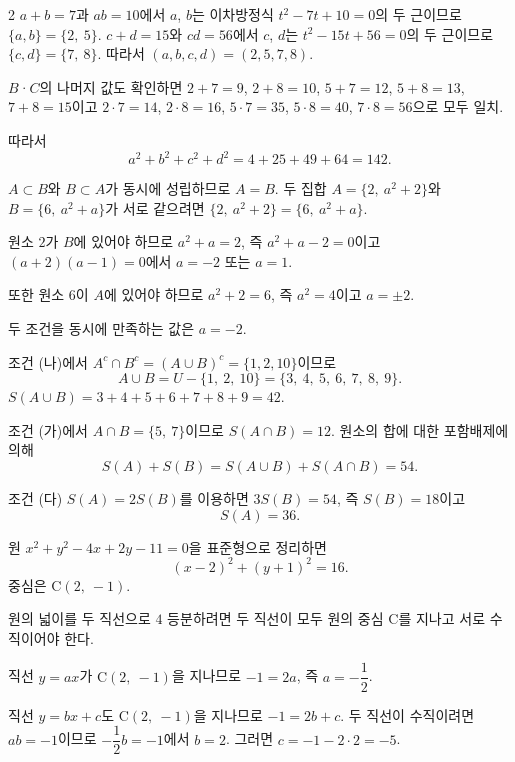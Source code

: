 \documentclass[10pt,fleqn]{article}
\begin{document}
\begin{multicols}{2}
$a + b = 7$과 $ab = 10$에서 $a$, $b$는 이차방정식 $t^{2} - 7t + 10 = 0$의 두 근이므로 $\{a, b\} = \{2,\ 5\}$. $c + d = 15$와 $cd = 56$에서 $c$, $d$는 $t^{2} - 15t + 56 = 0$의 두 근이므로 $\{c, d\} = \{7,\ 8\}$. 따라서 $(a, b, c, d) = (2, 5, 7, 8)$.

$B$·$C$의 나머지 값도 확인하면 $2 + 7 = 9$, $2 + 8 = 10$, $5 + 7 = 12$, $5 + 8 = 13$, $7 + 8 = 15$이고 $2 \cdot 7 = 14$, $2 \cdot 8 = 16$, $5 \cdot 7 = 35$, $5 \cdot 8 = 40$, $7 \cdot 8 = 56$으로 모두 일치.

따라서
\[ a^{2} + b^{2} + c^{2} + d^{2} = 4 + 25 + 49 + 64 = 142. \]


$A \subset B$와 $B \subset A$가 동시에 성립하므로 $A = B$. 두 집합 $A = \{2,\ a^{2} + 2\}$와 $B = \{6,\ a^{2} + a\}$가 서로 같으려면 $\{2,\ a^{2}+2\} = \{6,\ a^{2}+a\}$.

원소 $2$가 $B$에 있어야 하므로 $a^{2} + a = 2$, 즉 $a^{2} + a - 2 = 0$이고 $(a+2)(a-1) = 0$에서 $a = -2$ 또는 $a = 1$.

또한 원소 $6$이 $A$에 있어야 하므로 $a^{2} + 2 = 6$, 즉 $a^{2} = 4$이고 $a = \pm 2$.

두 조건을 동시에 만족하는 값은 $a = -2$.


조건 (나)에서 $A^{c} \cap B^{c} = (A \cup B)^{c} = \{1, 2, 10\}$이므로
\[ A \cup B = U - \{1,\ 2,\ 10\} = \{3,\ 4,\ 5,\ 6,\ 7,\ 8,\ 9\}. \]
$S(A \cup B) = 3 + 4 + 5 + 6 + 7 + 8 + 9 = 42$.

조건 (가)에서 $A \cap B = \{5,\ 7\}$이므로 $S(A \cap B) = 12$. 원소의 합에 대한 포함배제에 의해
\[ S(A) + S(B) = S(A \cup B) + S(A \cap B) = 54. \]

조건 (다) $S(A) = 2 S(B)$를 이용하면 $3 S(B) = 54$, 즉 $S(B) = 18$이고
\[ S(A) = 36. \]


원 $x^{2} + y^{2} - 4x + 2y - 11 = 0$을 표준형으로 정리하면
\[ (x - 2)^{2} + (y + 1)^{2} = 16. \]
중심은 $\mathrm{C}(2,\ -1)$.

원의 넓이를 두 직선으로 $4$ 등분하려면 두 직선이 모두 원의 중심 $\mathrm{C}$를 지나고 서로 수직이어야 한다.

직선 $y = ax$가 $\mathrm{C}(2,\ -1)$을 지나므로 $-1 = 2a$, 즉 $a = -\dfrac{1}{2}$.

직선 $y = bx + c$도 $\mathrm{C}(2,\ -1)$을 지나므로 $-1 = 2b + c$. 두 직선이 수직이려면 $ab = -1$이므로 $-\dfrac{1}{2} b = -1$에서 $b = 2$. 그러면 $c = -1 - 2 \cdot 2 = -5$.


\end{multicols}
\end{document}
